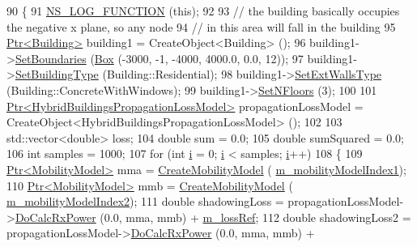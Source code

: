 \begin{DoxyCode}
90 \{
91   \hyperlink{log-macros-disabled_8h_a90b90d5bad1f39cb1b64923ea94c0761}{NS\_LOG\_FUNCTION} (\textcolor{keyword}{this});
92 
93   \textcolor{comment}{// the building basically occupies the negative x plane, so any node}
94   \textcolor{comment}{// in this area will fall in the building }
95   \hyperlink{classns3_1_1Ptr}{Ptr<Building>} building1 = CreateObject<Building> ();
96   building1->\hyperlink{classns3_1_1Building_a4b69659f05a983f06e33e7db62415915}{SetBoundaries} (\hyperlink{classns3_1_1Box}{Box} (-3000, -1, -4000, 4000.0, 0.0, 12));
97   building1->\hyperlink{classns3_1_1Building_a2f193ed27d25ed8bf29962d3c7d77204}{SetBuildingType} (Building::Residential);
98   building1->\hyperlink{classns3_1_1Building_a8084b2aafb9ca8bcb775fad0319d42e8}{SetExtWallsType} (Building::ConcreteWithWindows);
99   building1->\hyperlink{classns3_1_1Building_ae9f97075b5c8bf4685703e30ed049791}{SetNFloors} (3);
100   
101   \hyperlink{classns3_1_1Ptr}{Ptr<HybridBuildingsPropagationLossModel>} propagationLossModel = 
      CreateObject<HybridBuildingsPropagationLossModel> ();
102   
103   std::vector<double> loss;
104   \textcolor{keywordtype}{double} sum = 0.0;
105   \textcolor{keywordtype}{double} sumSquared = 0.0;
106   \textcolor{keywordtype}{int} samples = 1000;
107   \textcolor{keywordflow}{for} (\textcolor{keywordtype}{int} \hyperlink{bernuolliDistribution_8m_a6f6ccfcf58b31cb6412107d9d5281426}{i} = 0; \hyperlink{bernuolliDistribution_8m_a6f6ccfcf58b31cb6412107d9d5281426}{i} < samples; \hyperlink{bernuolliDistribution_8m_a6f6ccfcf58b31cb6412107d9d5281426}{i}++)
108     \{
109       \hyperlink{classns3_1_1Ptr}{Ptr<MobilityModel>} mma = \hyperlink{classBuildingsShadowingTestCase_a43039af62f5ba963a7132f8f1cafe5e1}{CreateMobilityModel} (
      \hyperlink{classBuildingsShadowingTestCase_a48369c8e0004d146992c086981cbcb6b}{m\_mobilityModelIndex1});
110       \hyperlink{classns3_1_1Ptr}{Ptr<MobilityModel>} mmb = \hyperlink{classBuildingsShadowingTestCase_a43039af62f5ba963a7132f8f1cafe5e1}{CreateMobilityModel} (
      \hyperlink{classBuildingsShadowingTestCase_a0f84dc1386c8a3a4c99ee510ae76f853}{m\_mobilityModelIndex2});
111       \textcolor{keywordtype}{double} shadowingLoss = propagationLossModel->\hyperlink{classns3_1_1BuildingsPropagationLossModel_a4037802437c75f0b1707997c8612bdaf}{DoCalcRxPower} (0.0, mma, mmb) + 
      \hyperlink{classBuildingsShadowingTestCase_a7eb9f41d818668469ece643f7fc2a1d6}{m\_lossRef};
112       \textcolor{keywordtype}{double} shadowingLoss2 = propagationLossModel->\hyperlink{classns3_1_1BuildingsPropagationLossModel_a4037802437c75f0b1707997c8612bdaf}{DoCalcRxPower} (0.0, mma, mmb) + 

\end{DoxyCode}
